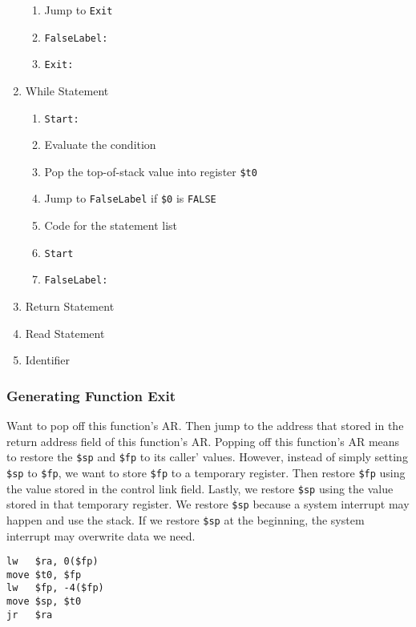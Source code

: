 \documentclass[11pt]{article}
\begin{document}
\begin{enumerate}
\begin{enumerate}
\item Jump to \texttt{Exit}
\item \texttt{FalseLabel:}
\item \texttt{Exit:}
\end{enumerate}
\item While Statement
\label{sec:org22be3f9}
\begin{enumerate}
\item \texttt{Start:}
\item Evaluate the condition
\item Pop the top-of-stack value into register \texttt{\$t0}
\item Jump to \texttt{FalseLabel} if \texttt{\$0} is \texttt{FALSE}
\item Code for the statement list
\item \texttt{Start}
\item \texttt{FalseLabel:}
\end{enumerate}
\item Return Statement
\label{sec:org1fa4f9c}
\item Read Statement
\label{sec:orga0fc707}
\item Identifier
\label{sec:org10820b8}
\end{enumerate}
\subsubsection{Generating Function Exit}
\label{sec:org456a23b}
Want to pop off this function's AR. Then jump to the address that stored in the return address
field of this function's AR. Popping off this function's AR means to restore the \texttt{\$sp} and \texttt{\$fp}
to its caller' values. However, instead of simply setting \texttt{\$sp} to \texttt{\$fp}, we want to store \texttt{\$fp}
to a temporary register. Then restore \texttt{\$fp} using the value stored in the control link
field. Lastly, we restore \texttt{\$sp} using the value stored in that temporary register. We restore
\texttt{\$sp} because a system interrupt may happen and use the stack. If we restore \texttt{\$sp} at the
beginning, the system interrupt may overwrite data we need.
\begin{verbatim}
lw   $ra, 0($fp)
move $t0, $fp
lw   $fp, -4($fp) 
move $sp, $t0 
jr   $ra
\end{verbatim}
\end{document}
